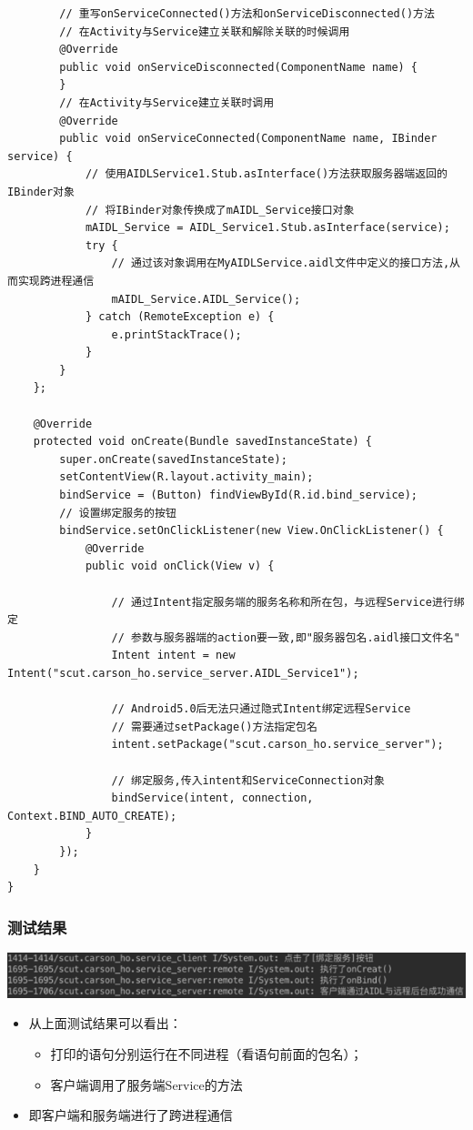 \documentclass[9pt, b5paper]{article}
\begin{document}
\begin{itemize}
\begin{verbatim}
        // 重写onServiceConnected()方法和onServiceDisconnected()方法
        // 在Activity与Service建立关联和解除关联的时候调用
        @Override
        public void onServiceDisconnected(ComponentName name) {
        }
        // 在Activity与Service建立关联时调用
        @Override
        public void onServiceConnected(ComponentName name, IBinder service) {
            // 使用AIDLService1.Stub.asInterface()方法获取服务器端返回的IBinder对象
            // 将IBinder对象传换成了mAIDL_Service接口对象
            mAIDL_Service = AIDL_Service1.Stub.asInterface(service);
            try {
                // 通过该对象调用在MyAIDLService.aidl文件中定义的接口方法,从而实现跨进程通信
                mAIDL_Service.AIDL_Service();
            } catch (RemoteException e) {
                e.printStackTrace();
            }
        }
    };

    @Override
    protected void onCreate(Bundle savedInstanceState) {
        super.onCreate(savedInstanceState);
        setContentView(R.layout.activity_main);
        bindService = (Button) findViewById(R.id.bind_service);
        // 设置绑定服务的按钮
        bindService.setOnClickListener(new View.OnClickListener() {
            @Override
            public void onClick(View v) {

                // 通过Intent指定服务端的服务名称和所在包，与远程Service进行绑定
                // 参数与服务器端的action要一致,即"服务器包名.aidl接口文件名"
                Intent intent = new Intent("scut.carson_ho.service_server.AIDL_Service1");

                // Android5.0后无法只通过隐式Intent绑定远程Service
                // 需要通过setPackage()方法指定包名
                intent.setPackage("scut.carson_ho.service_server");

                // 绑定服务,传入intent和ServiceConnection对象
                bindService(intent, connection, Context.BIND_AUTO_CREATE);
            }
        });
    }
}
\end{verbatim}
\end{itemize}
\subsubsection{测试结果}
\label{sec-5-6-3}

\includegraphics[width=.9\linewidth]{./pic/serverClient.png}
\begin{itemize}
\item 从上面测试结果可以看出：
\begin{itemize}
\item 打印的语句分别运行在不同进程（看语句前面的包名）；
\item 客户端调用了服务端Service的方法
\end{itemize}
\item 即客户端和服务端进行了跨进程通信
\end{itemize}
\end{document}
